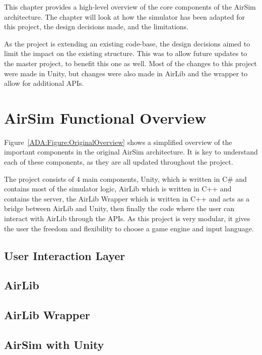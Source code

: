 This chapter provides a high-level overview of the core components of the AirSim architecture. The chapter will look at how the simulator has been adapted for this project, the design decisions made, and the limitations. 

As the project is extending an existing code-base, the design decisions aimed to limit the impact on the existing structure. This was to allow future updates to the master project, to benefit this one as well. Most of the changes to this project were made in Unity, but changes were also made in AirLib and the wrapper to allow for additional APIs. 

\section{AirSim Functional Overview}
Figure~\ref{ADA:Figure:OriginalOverview} shows a simplified overview of the important components in the original AirSim architecture. It is key to understand each of these components, as they are all updated throughout the project. 


The project consists of 4 main components, Unity, which is written in C\# and contains most of the simulator logic, AirLib which is written in C++ and contains the server, the AirLib Wrapper which is written in C++ and acts as a bridge between AirLib and Unity, then finally the code where the user can interact with AirLib through the APIs. As this project is very modular, it gives the user the freedom and flexibility to choose a game engine and input language. 

\subsection{User Interaction Layer}

\subsection{AirLib}

\subsection{AirLib Wrapper}

\subsection{AirSim with Unity}

